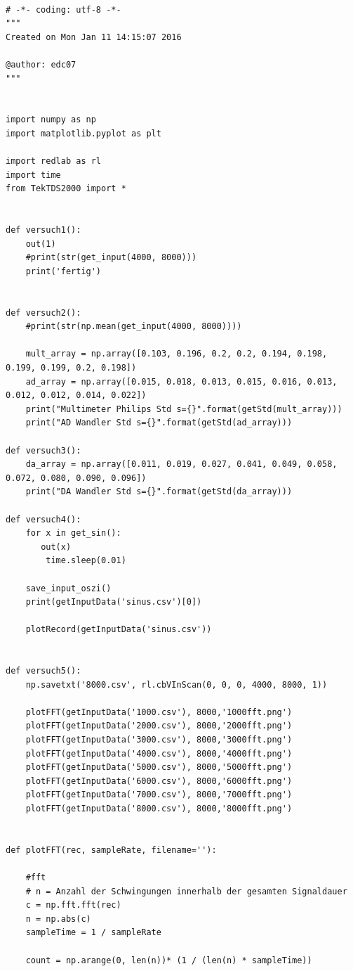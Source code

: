 \documentclass[12pt,oneside,a4paper]{report}
\begin{document}
\begin{lstlisting}[style=PYTHON, frame=single, caption=QuellCodeV1 bis V4, captionpos=b, label=lst:Code]

# -*- coding: utf-8 -*-
"""
Created on Mon Jan 11 14:15:07 2016

@author: edc07
"""


import numpy as np
import matplotlib.pyplot as plt

import redlab as rl
import time
from TekTDS2000 import *


def versuch1():
    out(1)
    #print(str(get_input(4000, 8000)))
    print('fertig')


def versuch2():
    #print(str(np.mean(get_input(4000, 8000))))

    mult_array = np.array([0.103, 0.196, 0.2, 0.2, 0.194, 0.198, 0.199, 0.199, 0.2, 0.198])
    ad_array = np.array([0.015, 0.018, 0.013, 0.015, 0.016, 0.013, 0.012, 0.012, 0.014, 0.022])
    print("Multimeter Philips Std s={}".format(getStd(mult_array)))
    print("AD Wandler Std s={}".format(getStd(ad_array)))

def versuch3():
    da_array = np.array([0.011, 0.019, 0.027, 0.041, 0.049, 0.058, 0.072, 0.080, 0.090, 0.096])
    print("DA Wandler Std s={}".format(getStd(da_array)))

def versuch4():    
    for x in get_sin():
       out(x)
        time.sleep(0.01)
    
    save_input_oszi()
    print(getInputData('sinus.csv')[0])
    
    plotRecord(getInputData('sinus.csv'))


def versuch5():
    np.savetxt('8000.csv', rl.cbVInScan(0, 0, 0, 4000, 8000, 1))
    
    plotFFT(getInputData('1000.csv'), 8000,'1000fft.png')
    plotFFT(getInputData('2000.csv'), 8000,'2000fft.png')
    plotFFT(getInputData('3000.csv'), 8000,'3000fft.png')
    plotFFT(getInputData('4000.csv'), 8000,'4000fft.png')
    plotFFT(getInputData('5000.csv'), 8000,'5000fft.png')
    plotFFT(getInputData('6000.csv'), 8000,'6000fft.png')
    plotFFT(getInputData('7000.csv'), 8000,'7000fft.png')
    plotFFT(getInputData('8000.csv'), 8000,'8000fft.png')


def plotFFT(rec, sampleRate, filename=''):
    
    #fft
    # n = Anzahl der Schwingungen innerhalb der gesamten Signaldauer
    c = np.fft.fft(rec)
    n = np.abs(c)
    sampleTime = 1 / sampleRate
    
    count = np.arange(0, len(n))* (1 / (len(n) * sampleTime))
    

\end{lstlisting}
\end{document}
